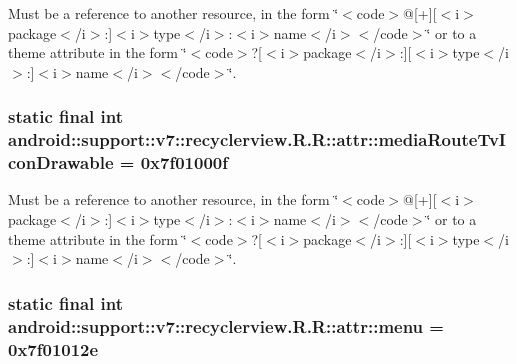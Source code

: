 Must be a reference to another resource, in the form \char`\"{}$<$code$>$@\mbox{[}+\mbox{]}\mbox{[}$<$i$>$package$<$/i$>$:\mbox{]}$<$i$>$type$<$/i$>$:$<$i$>$name$<$/i$>$$<$/code$>$\char`\"{} or to a theme attribute in the form \char`\"{}$<$code$>$?\mbox{[}$<$i$>$package$<$/i$>$:\mbox{]}\mbox{[}$<$i$>$type$<$/i$>$:\mbox{]}$<$i$>$name$<$/i$>$$<$/code$>$\char`\"{}. \hypertarget{classandroid_1_1support_1_1v7_1_1recyclerview_1_1_r_1_1attr_1cfc83d533686117f36192ee0fdb3a25}{
\subsubsection[{mediaRouteTvIconDrawable}]{\setlength{\rightskip}{0pt plus 5cm}static final int android::support::v7::recyclerview.R.R::attr::mediaRouteTvIconDrawable = 0x7f01000f}}
\label{classandroid_1_1support_1_1v7_1_1recyclerview_1_1_r_1_1attr_1cfc83d533686117f36192ee0fdb3a25}


Must be a reference to another resource, in the form \char`\"{}$<$code$>$@\mbox{[}+\mbox{]}\mbox{[}$<$i$>$package$<$/i$>$:\mbox{]}$<$i$>$type$<$/i$>$:$<$i$>$name$<$/i$>$$<$/code$>$\char`\"{} or to a theme attribute in the form \char`\"{}$<$code$>$?\mbox{[}$<$i$>$package$<$/i$>$:\mbox{]}\mbox{[}$<$i$>$type$<$/i$>$:\mbox{]}$<$i$>$name$<$/i$>$$<$/code$>$\char`\"{}. \hypertarget{classandroid_1_1support_1_1v7_1_1recyclerview_1_1_r_1_1attr_f222020730d333b98883ffc57b4a77bb}{
\subsubsection[{menu}]{\setlength{\rightskip}{0pt plus 5cm}static final int android::support::v7::recyclerview.R.R::attr::menu = 0x7f01012e}}
\label{classandroid_1_1support_1_1v7_1_1recyclerview_1_1_r_1_1attr_f222020730d333b98883ffc57b4a77bb}


